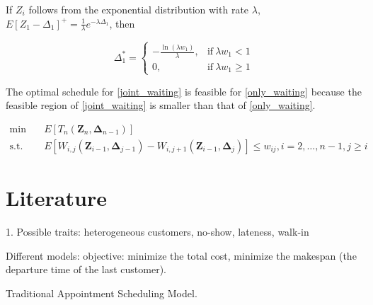 \documentclass{article}
\newcommand{\Z}{\mathbf{Z}}
\newcommand{\D}{\bm{\Delta}}
\begin{document}
If $Z_{i}$ follows from the exponential distribution with rate $\lambda$, $E\left[Z_{1}- \Delta_{1} \right]^{+} = \frac{1}{\lambda} e^{-\lambda \Delta_{1}}$, then

\begin{equation*}
	\Delta_{1}^{*} = \begin{cases}
	-\frac{\ln (\lambda w_{1})}{\lambda}, & \text{if}~ \lambda w_{1} < 1 \\
	0, & \text{if}~ \lambda w_{1} \geq 1	
	\end{cases}
\end{equation*}

\vspace{10cm}

The optimal schedule for \eqref{joint_waiting} is feasible for \eqref{only_waiting} because the feasible region of \eqref{joint_waiting} is smaller than that of \eqref{only_waiting}.

\begin{equation}\label{only_waiting}
    \begin{aligned}
        \min \quad & E \left[T_n(\Z_{n}, \D_{n-1}) \right] \\
        \mbox{s.t.} \quad & E\left[W_{i,j}(\Z_{i-1}, \D_{j-1})-W_{i,j+1}(\Z_{i-1}, \D_{j}) \right] \leq w_{ij}, i =2, \ldots, n-1, j \geq i
    \end{aligned}
\end{equation}





\newpage


\section{Literature}

1. Possible traits: heterogeneous customers, no-show, lateness, walk-in

Different models: objective: minimize the total cost, minimize the makespan (the departure time of the last customer).


Traditional Appointment Scheduling Model.
\end{document}
